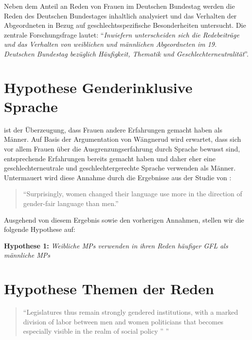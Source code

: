 \documentclass[12pt, 
    twoside=false, 
    bibliography=totoc, 
    numbers=endperiod, 
    headings=normal, 
    toc=chapterentrydotfill
    ]{scrbook}
\begin{document}
Neben dem Anteil an Reden von Frauen im Deutschen Bundestag werden die Reden des Deutschen Bundestages inhaltlich analysiert und das Verhalten der Abgeordneten in Bezug auf geschlechtsspezifische Besonderheiten untersucht. Die zentrale Forschungsfrage lautet: \enquote{\emph{Inwiefern unterscheiden sich die Redebeiträge und das Verhalten von weiblichen und männlichen Abgeordneten im 19. Deutschen Bundestag bezüglich Häufigkeit, Thematik und Geschlechterneutralität}}.


\section{Hypothese Genderinklusive Sprache}\label{kapitel:hypothese1}

\textcite*{wangnerud_2000} ist der Überzeugung, dass Frauen andere Erfahrungen gemacht haben als Männer. Auf Basis der Argumentation von Wängnerud \parencites*{wangnerud_2000}{wangnerud_2009} wird erwartet, dass sich vor allem Frauen über die Ausgrenzungserfahrung durch Sprache bewusst sind, entsprechende Erfahrungen bereits gemacht haben und daher eher eine geschlechterneutrale und geschlechtergerechte Sprache verwenden als Männer. Untermauert wird diese Annahme durch die Ergebnisse aus der Studie von \textcite{koeser_2014} :
\citereset
\begin{quote}
    \enquote {Surprisingly, women changed their language use more in the direction of gender-fair language than men.} \parencite[555]{koeser_2014}
\end{quote}

Ausgehend von diesem Ergebnis sowie den vorherigen Annahmen, stellen wir die folgende Hypothese auf: 

\textbf{Hypothese 1:} \emph{Weibliche MPs verwenden in ihren Reden häufiger GFL als männliche MPs}


\section{Hypothese Themen der Reden}\label{kapitel:hypothese2}

\begin{quote}
    \enquote{Legislatures thus remain strongly gendered institutions, with a marked division of labor between men and women politicians that becomes especially visible in the realm of social policy ” \parencite[250]{ennser-jedenastik_2017}}
\end{quote}
\end{document}
